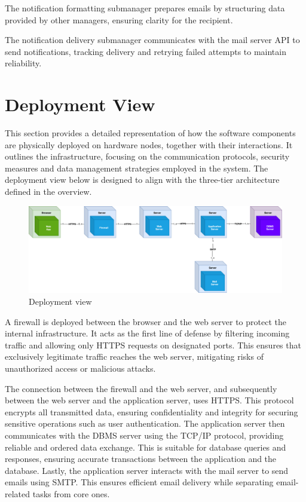 The notification formatting submanager prepares emails by structuring data provided by other managers, ensuring clarity for the recipient.

The notification delivery submanager communicates with the mail server API to send notifications, tracking delivery and retrying failed attempts to maintain reliability.

\section{Deployment View}
This section provides a detailed representation of how the software components are physically deployed on hardware nodes, together with their interactions.
It outlines the infrastructure, focusing on the communication protocols, security measures and data management strategies employed in the system.
The deployment view below is designed to align with the three-tier architecture defined in the overview.

\begin{figure}[ht]
    \centering
    \includegraphics[width=16cm]{images/deployment-view.png}
    \caption{Deployment view}
\end{figure}

A firewall is deployed between the browser and the web server to protect the internal infrastructure.
It acts as the first line of defense by filtering incoming traffic and allowing only HTTPS requests on designated ports.
This ensures that exclusively legitimate traffic reaches the web server, mitigating risks of unauthorized access or malicious attacks.

The connection between the firewall and the web server, and subsequently between the web server and the application server, uses HTTPS.
This protocol encrypts all transmitted data, ensuring confidentiality and integrity for securing sensitive operations such as user authentication.
The application server then communicates with the DBMS server using the TCP/IP protocol, providing reliable and ordered data exchange.
This is suitable for database queries and responses, ensuring accurate transactions between the application and the database.
Lastly, the application server interacts with the mail server to send emails using SMTP.
This ensures efficient email delivery while separating email-related tasks from core ones.

